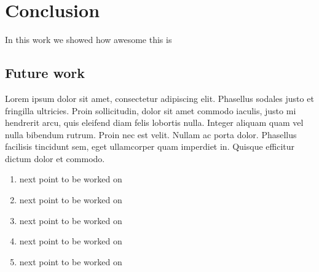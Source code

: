 \chapter{Conclusion} \label{cha:conclusion}

In this work we showed how awesome this is

\section*{Future work}

 Lorem ipsum dolor sit amet, consectetur adipiscing elit. Phasellus sodales justo et fringilla ultricies. Proin sollicitudin, dolor sit amet commodo iaculis, justo mi hendrerit arcu, quis eleifend diam felis lobortis nulla. Integer aliquam quam vel nulla bibendum rutrum. Proin nec est velit. Nullam ac porta dolor. Phasellus facilisis tincidunt sem, eget ullamcorper quam imperdiet in. Quisque efficitur dictum dolor et commodo. 
 
\begin{enumerate}
  \item next point to be worked on 
  \item next point to be worked on 
  \item next point to be worked on 
  \item next point to be worked on 
  \item next point to be worked on 
\end{enumerate}
